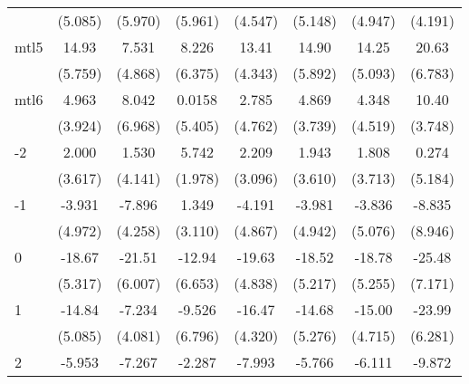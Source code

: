 \documentclass{article}
\begin{document}
{\begin{longtable}{l*{7}{c}}
                &  (5.085)         &  (5.970)         &  (5.961)         &  (4.547)         &  (5.148)         &  (4.947)         &  (4.191)         \\
mtl5            &    14.93\sym{*}  &    7.531         &    8.226         &    13.41\sym{**} &    14.90\sym{*}  &    14.25\sym{*}  &    20.63\sym{**} \\
                &  (5.759)         &  (4.868)         &  (6.375)         &  (4.343)         &  (5.892)         &  (5.093)         &  (6.783)         \\
mtl6            &    4.963         &    8.042         &   0.0158         &    2.785         &    4.869         &    4.348         &    10.40\sym{*}  \\
                &  (3.924)         &  (6.968)         &  (5.405)         &  (4.762)         &  (3.739)         &  (4.519)         &  (3.748)         \\
-2              &    2.000         &    1.530         &    5.742\sym{*}  &    2.209         &    1.943         &    1.808         &    0.274         \\
                &  (3.617)         &  (4.141)         &  (1.978)         &  (3.096)         &  (3.610)         &  (3.713)         &  (5.184)         \\
-1              &   -3.931         &   -7.896         &    1.349         &   -4.191         &   -3.981         &   -3.836         &   -8.835         \\
                &  (4.972)         &  (4.258)         &  (3.110)         &  (4.867)         &  (4.942)         &  (5.076)         &  (8.946)         \\
0               &   -18.67\sym{**} &   -21.51\sym{**} &   -12.94         &   -19.63\sym{**} &   -18.52\sym{**} &   -18.78\sym{**} &   -25.48\sym{**} \\
                &  (5.317)         &  (6.007)         &  (6.653)         &  (4.838)         &  (5.217)         &  (5.255)         &  (7.171)         \\
1               &   -14.84\sym{*}  &   -7.234         &   -9.526         &   -16.47\sym{**} &   -14.68\sym{*}  &   -15.00\sym{**} &   -23.99\sym{**} \\
                &  (5.085)         &  (4.081)         &  (6.796)         &  (4.320)         &  (5.276)         &  (4.715)         &  (6.281)         \\
2               &   -5.953         &   -7.267         &   -2.287         &   -7.993         &   -5.766         &   -6.111         &   -9.872         \\

\end{longtable}}
\end{document}
